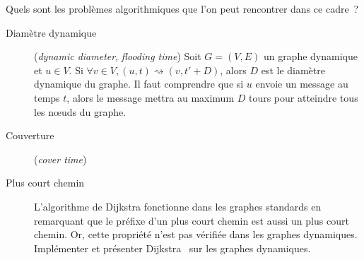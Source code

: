 \documentclass[12pt,a4paper]{article}
\begin{document}
Quels sont les problèmes algorithmiques que l'on peut rencontrer dans
ce cadre~?

\begin{description}
\item[Diamètre dynamique] (\textit{dynamic diameter}, \textit{flooding
    time}) Soit \(G = (V, E)\) un graphe dynamique et \(u \in V\). Si
  \(\forall v \in V, (u, t) \rightsquigarrow (v, t' + D)\), alors
  \(D\) est le diamètre dynamique du graphe. Il faut comprendre que si
  \(u\) envoie un message au temps \(t\), alors le message mettra au
  maximum \(D\) tours pour atteindre tous les nœuds du graphe.
\item[Couverture] (\textit{cover time})
\item[Plus court chemin] L'algorithme de Dijkstra fonctionne dans les
  graphes standards en remarquant que le préfixe d'un plus court
  chemin est aussi un plus court chemin. Or, cette propriété n'est
  pas vérifiée dans les graphes dynamiques.\\
  Implémenter et présenter Dijkstra~\cite{xuan2003computing} sur les
  graphes dynamiques.
\end{description}

\printbibliography{}
\end{document}
